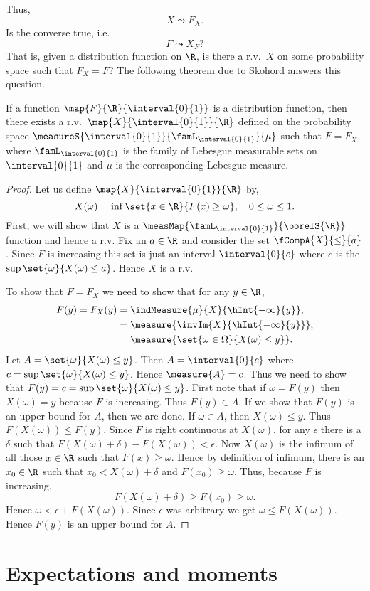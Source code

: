Thus,
\[X \leadsto F_X.\]
Is the converse true, i.e.
\[F \leadsto X_F?\]
That is, given a distribution function on $\R$, is there a r.v.~$X$ on some probability space such that $F_X =
F$?
The following theorem due to Skohord answers this question.
\begin{Theorem}\label{thm:distribution_func_to_rv}
    If a function $\map{F}{\R}{\interval{0}{1}}$ is a distribution function, then there exists a
    r.v.~$\map{X}{\interval{0}{1}}{\R}$ defined
    on the probability space $\measureS{\interval{0}{1}}{\famL_{\interval{0}{1}}}{\mu}$ such that $F = F_X$,
    where $\famL_{\interval{0}{1}}$ is the family of Lebesgue measurable sets on $\interval{0}{1}$ and $\mu$
    is the corresponding Lebesgue measure.
\end{Theorem}
\begin{proof}
    Let us define $\map{X}{\interval{0}{1}}{\R}$ by,
    \[X(\omega) = \inf\set{x\in\R}{F(x)\geq \omega},\quad 0\leq\omega\leq 1.\]
    First, we will show that $X$ is a $\measMap{\famL_{\interval{0}{1}}}{\borelS{\R}}$ function and hence a 
    r.v. Fix an $a \in \R$ and consider the set $\fCompA{X}{\leq}{a}$. Since $F$ is increasing this set is
    just an interval $\interval{0}{c}$ where $c$ is the $\sup\set{\omega}{X(\omega)\leq a}$. Hence $X$ is a r.v.

    To show that $F = F_X$ we need to show that for any $y\in \R$,
    \begin{align*}
	F(y) = F_X(y) &= \indMeasure{\mu}{X}{\hInt{-\infty}{y}},\\
	& = \measure{\invIm{X}{\hInt{-\infty}{y}}},\\
	& = \measure{\set{\omega\in\Omega}{X(\omega)\leq y}}.
    \end{align*}
    Let $A = \set{\omega}{X(\omega)\leq y}$. Then $A = \interval{0}{c}$ where 
    $c = \sup\set{\omega}{X(\omega)\leq y}$. Hence $\measure{A} = c$. Thus we need
    to show that $F(y) = c = \sup\set{\omega}{X(\omega)\leq y}$.
    First note that if $\omega = F(y)$ then $X(\omega) = y$ because $F$ is increasing. Thus $F(y) \in A$. If
    we show that $F(y)$ is an upper bound for $A$, then we are done. If $\omega \in A$, then $X(\omega) \leq
    y$. Thus $F(X(\omega)) \leq F(y)$. Since $F$ is right continuous at $X(\omega)$, for any $\epsilon$ there
    is a $\delta$ such that $F(X(\omega) + \delta) - F(X(\omega)) < \epsilon$. Now $X(\omega)$ is the infimum
    of all those $x \in \R$ such that $F(x) \geq \omega$. Hence by definition of infimum, 
    there is an $x_0 \in\R$ such that $x_0 <
    X(\omega) + \delta$ and $F(x_0) \geq \omega$. Thus, because $F$ is increasing,
    \[F(X(\omega)+\delta) \geq F(x_0) \geq \omega.\]
    Hence $\omega < \epsilon + F(X(\omega))$. Since $\epsilon$ was arbitrary we get $\omega \leq
    F(X(\omega))$. Hence $F(y)$ is an upper bound for $A$.
\end{proof}
\section{Expectations and moments}
